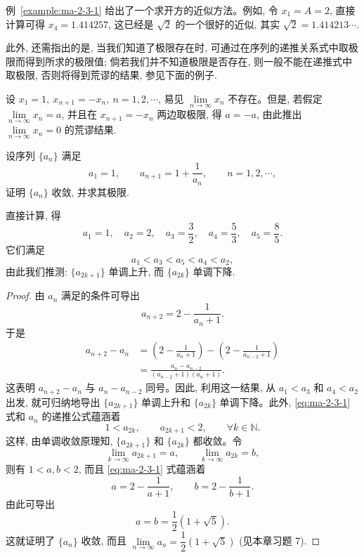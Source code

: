 \begin{remark}\label{remark:ma-2-source-59}
例~\ref{example:ma-2-3-1} 给出了一个求开方的近似方法。例如, 令 $x_1=A=2$, 直接计算可得 $x_4=1.414257$, 这已经是 $\sqrt2$ 的一个很好的近似, 其实 $\sqrt2=1.414213\cdots$.
\end{remark}

此外, 还需指出的是, 当我们知道了极限存在时, 可通过在序列的递推关系式中取极限而得到所求的极限值; 倘若我们并不知道极限是否存在, 则一般不能在递推式中取极限, 否则将得到荒谬的结果, 参见下面的例子.

\begin{example}\label{example:ma-2-3-2}
设 $x_1=1,\ x_{n+1}=-x_n,\ n=1,2,\cdots$, 易见 $\lim\limits_{n\to\infty}x_n$ 不存在。但是, 若假定 $\lim\limits_{n\to\infty}x_n=a$, 并且在 $x_{n+1}=-x_n$ 两边取极限, 得 $a=-a$, 由此推出 $\lim\limits_{n\to\infty}x_n=0$ 的荒谬结果.
\end{example}


\begin{example}\label{example:ma-2-3-3}
设序列 $\{a_n\}$ 满足
\[
  a_1=1,\qquad a_{n+1}=1+\frac1{a_n},\qquad n=1,2,\cdots,
\]
证明 $\{a_n\}$ 收敛, 并求其极限.
\end{example}


\begin{analyze}
直接计算, 得
\[
  a_1=1,\quad a_2=2,\quad a_3=\frac32,\quad a_4=\frac53,\quad a_5=\frac85.
\]
它们满足
\[
  a_1<a_3<a_5<a_4<a_2,
\]
由此我们推测: $\{a_{2k+1}\}$ 单调上升, 而 $\{a_{2k}\}$ 单调下降.
\end{analyze}


\begin{proof}
由 $a_n$ 满足的条件可导出
\begin{equation}
  a_{n+2}=2-\frac1{a_n+1}.
  \label{eq:ma-2-3-1}
\end{equation}
于是
\[
\begin{aligned}
  a_{n+2}-a_n
  &=
  \left(2-\frac1{a_n+1}\right)
  -
  \left(2-\frac1{a_{n-2}+1}\right)\\
  &=
  \frac{a_n-a_{n-2}}{(a_{n-2}+1)(a_n+1)}.
\end{aligned}
\]
这表明 $a_{n+2}-a_n$ 与 $a_n-a_{n-2}$ 同号。因此, 利用这一结果, 从 $a_1<a_3$ 和 $a_4<a_2$ 出发, 就可归纳地导出 $\{a_{2k+1}\}$ 单调上升和 $\{a_{2k}\}$ 单调下降。此外, \eqref{eq:ma-2-3-1} 式和 $a_n$ 的递推公式蕴涵着
\[
  1<a_{2k},\qquad a_{2k+1}<2,\qquad \forall k\in\mathbb{N}.
\]
这样, 由单调收敛原理知, $\{a_{2k+1}\}$ 和 $\{a_{2k}\}$ 都收敛。令
\[
  \lim_{k\to\infty}a_{2k+1}=a,\qquad
  \lim_{k\to\infty}a_{2k}=b,
\]
则有 $1<a,b<2$, 而且 \eqref{eq:ma-2-3-1} 式蕴涵着
\[
  a=2-\frac1{a+1},\qquad b=2-\frac1{b+1}.
\]
由此可导出
\[
  a=b=\frac12(1+\sqrt5).
\]
这就证明了 $\{a_n\}$ 收敛, 而且 $\lim\limits_{n\to\infty}a_n=\dfrac12(1+\sqrt5)$ (见本章习题 7).
\end{proof}


